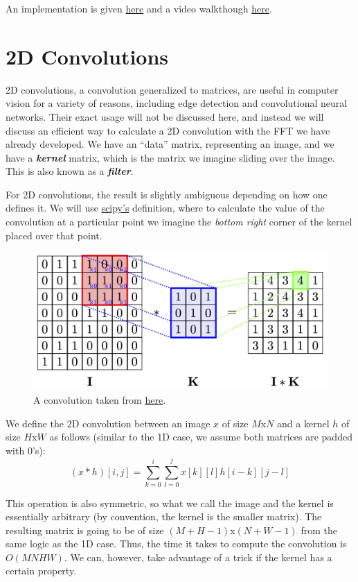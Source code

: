 \documentclass[11pt, oneside]{article}
\newcommand{\emphasis}[1]{\textbf{\textit{#1}}}
\theoremstyle{plain}
\theoremstyle{definition}
\begin{document}
An implementation is given
\href{https://github.com/stephen-huan/anime-music-quiz}{here} and a video
walkthough \href{https://www.youtube.com/watch?v=7fUicc_lIGA}{here}.

\section{2D Convolutions}
2D convolutions, a convolution generalized to matrices, are useful in computer
vision for a variety of reasons, including edge detection and convolutional
neural networks. Their exact usage will not be discussed here, and instead
we will discuss an efficient way to calculate a 2D convolution with the FFT we 
have already developed. We have an \enquote{data} matrix, representing an image,
and we have a \emphasis{kernel} matrix, which is the matrix we imagine
sliding over the image. This is also known as a \emphasis{filter}.

For 2D convolutions, the result is slightly ambiguous depending on how one
defines it. We will use
\href{https://docs.scipy.org/doc/scipy/reference/generated/scipy.signal.convolve2d.html}{scipy's}
definition, where to calculate the value of the convolution at a particular
point we imagine the \textit{bottom right} corner of the kernel
placed over that point.

\begin{figure}[h!]
  \centering
  \includegraphics[scale=1.5]{conv.png}
  \caption{A convolution taken from \href{https://petar-v.com/GAT/}{here}.}
\end{figure}

We define the 2D convolution between an image \( x \) of size \( M \)x\( N \)
and a kernel \( h \) of size \( H \)x\( W \) as follows
(similar to the 1D case, we assume both matrices are padded with 0's):
\[ (x * h)[i, j] = \sum^i_{k = 0} \sum^j_{l = 0} x[k][l]h[i - k][j - l] \]

This operation is also symmetric, so  what we call the image and the kernel
is essentially arbitrary (by convention, the kernel is the smaller matrix).
The resulting matrix is going to be of size \( (M + H - 1) \)x\( (N + W - 1) \)
from the same logic as the 1D case. 
Thus, the time it takes to compute the convolution is \( O(MNHW) \).
We can, however, take advantage of a trick if the kernel has a certain property.
\end{document}
